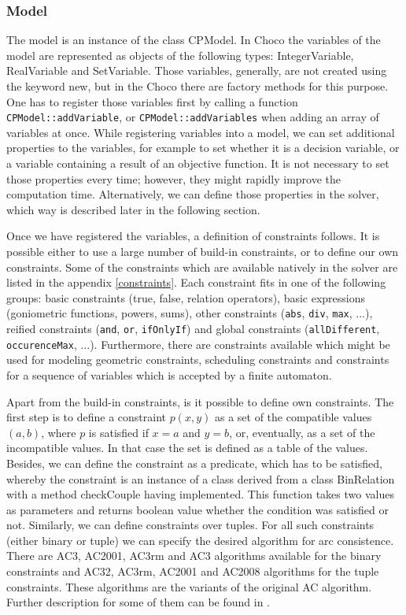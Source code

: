\subsubsection{Model}
The model is an instance of the class CPModel. In Choco the variables of the model are represented
as objects of the following types: IntegerVariable, RealVariable and SetVariable. Those 
variables, generally, are not created using the keyword new, but in the Choco there are
factory methods for this purpose. One has to register those variables first by calling
a function \texttt{CPModel::addVariable}, or \texttt{CPModel::addVariables} when adding an array of variables at once.
While registering variables into a model, we can set additional properties to the variables, 
for example to set whether it is a decision variable, or a variable containing a result
of an objective function. It is not necessary to set those properties every time; however,
they might rapidly improve the computation time. Alternatively, we can define those properties
in the solver, which way is described later in the following section.

Once we have registered the variables, a definition of constraints follows. It is possible
either to use a large number of build-in constraints, or to define our own constraints.
Some of the constraints which are available natively in the solver are listed in the appendix \ref{constraints}.
Each constraint fits in one of the following groups: basic constraints (true, false, relation operators),
basic expressions (goniometric functions, powers, sums), other constraints (\texttt{abs}, \texttt{div}, \texttt{max}, ...),
reified constraints (\texttt{and}, \texttt{or}, \texttt{ifOnlyIf}) and global constraints (\texttt{allDifferent}, 
\texttt{occurenceMax}, ...). Furthermore, there are constraints available which might be used for modeling geometric constraints,
scheduling constraints and constraints for a sequence of variables which is accepted by a finite automaton.

Apart from the build-in constraints, is it possible to define own constraints. The first step is to define 
a constraint $p(x,y)$ as a set of the compatible values $(a,b)$, where $p$ is satisfied
if $x=a$ and $y=b$, or, eventually, as a set of the incompatible values. In that case the
set is defined as a table of the values. Besides, we can define the constraint as a predicate, which has to
be satisfied, whereby the constraint is an instance of a class derived from a class BinRelation
with a method checkCouple having implemented. This function takes two values as parameters and 
returns boolean value whether the condition was satisfied or not. Similarly, we can define 
constraints over tuples. For all such constraints (either binary or tuple) we can specify the 
desired algorithm for arc consistence. There are AC3, AC2001, AC3rm and AC3 algorithms available 
for the binary constraints and AC32, AC3rm, AC2001 and AC2008 algorithms for the tuple constraints. 
These algorithms are the variants of the original AC algorithm. Further description for some of 
them can be found in \cite{bartak:ogcp}.
 
